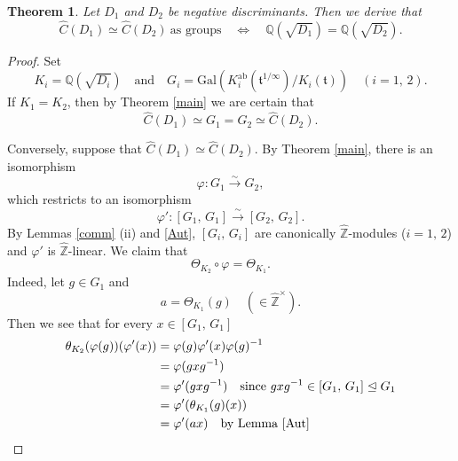 \documentclass[reqno,11pt]{article}
\theoremstyle{plain} %
\newtheorem{theorem}{\indent\sc Theorem}[section]
\theoremstyle{definition} %
\begin{document}
\begin{theorem}\label{rigidity}
Let $D_1$ and $D_2$ be negative discriminants. Then we derive that
\begin{equation*}
\widehat{C}(D_1)\simeq\widehat{C}(D_2)
~\text{as groups}
\quad\Longleftrightarrow\quad
\mathbb{Q}(\sqrt{D_1})=\mathbb{Q}(\sqrt{D_2}).
\end{equation*}
\end{theorem}
\begin{proof}
Set
\begin{equation*}
K_i=\mathbb{Q}(\sqrt{D_i})\quad\textrm{and}\quad
G_i=\mathrm{Gal}\left(K_i^\mathrm{ab}(\mathfrak{t}^{1/\infty})/K_i(\mathfrak{t})\right)
\quad(i=1,\,2).
\end{equation*}
If $K_1=K_2$, then by Theorem \ref{main} we are certain that
\begin{equation*}
\widehat{C}(D_1)\simeq G_1=G_2\simeq\widehat{C}(D_2).
\end{equation*}
\par
Conversely, suppose that
$\widehat{C}(D_1)\simeq\widehat{C}(D_2)$. By
Theorem \ref{main}, there is an isomorphism
\begin{equation*}
\varphi:G_1\stackrel{\sim}{\rightarrow}G_2,
\end{equation*}
which restricts to an isomorphism
\begin{equation*}
\varphi':[G_1,\,G_1]\stackrel{\sim}{\rightarrow}[G_2,\,G_2].
\end{equation*}
By Lemmas \ref{comm} (ii) and \ref{Aut}, $[G_i,\,G_i]$
are canonically $\widehat{\mathbb{Z}}$-modules ($i=1,\,2$) and $\varphi'$ is
$\widehat{\mathbb{Z}}$-linear.
We claim that
\begin{equation}\label{TvT}
\Theta_{K_2}\circ\varphi=\Theta_{K_1}.
\end{equation}
Indeed, let $g\in G_1$ and
\begin{equation*}
a=\Theta_{K_1}(g)\quad(\in\widehat{\mathbb{Z}}^\times).
\end{equation*}
Then we see that for every
$x\in[G_1,\,G_1]$
\begin{align*}
\theta_{K_2}(\varphi(g))(\varphi'(x))&=\varphi(g)\varphi'(x)\varphi(g)^{-1}\\
&=\varphi(gxg^{-1})\\
&=\varphi'(gxg^{-1})\quad\textrm{since}~gxg^{-1}\in [G_1,\,G_1]\trianglelefteq G_1\\
&=\varphi'(\theta_{K_1}(g)(x))\\
&=\varphi'(ax)\quad\textrm{by Lemma \ref{Aut}}\\

\end{align*}
\end{proof}
\end{document}
